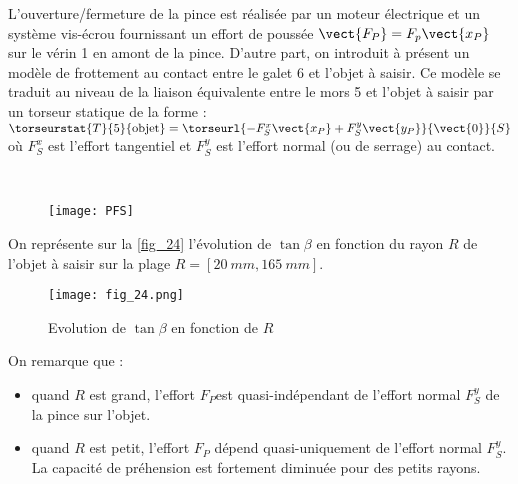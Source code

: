 L'ouverture/fermeture de la pince est réalisée par un moteur électrique et un système vis-écrou
fournissant un effort de poussée $\vect{F_P}=F_p\vect{x_P}$ sur le vérin 1 en amont de la pince. D'autre part, on
introduit à présent un modèle de frottement au contact entre le galet 6 et l'objet à saisir. Ce modèle
se traduit au niveau de la liaison équivalente entre le mors 5 et l'objet à saisir par un torseur
statique de la forme : $\torseurstat{T}{5}{\text{objet}}=\torseurl{-F_S^x\vect{x_P}+F_S^y\vect{y_P}}{\vect{0}}{S}$ 
où $F_S^x$ est l'effort tangentiel et $F_S^y$ est l'effort normal (ou de serrage) au contact.

\ifprof
\begin{corrige}~\\
\begin{figure}[H]
\centering
{\texttt{[image: PFS]}}
\end{figure}

\end{corrige}
\else
\fi

\ifprof
\else
On représente sur la \autoref{fig_24}  l'évolution de $\tan \beta$ en fonction du rayon $R$ de l'objet à saisir sur la plage $R =[\SI{20}{mm}, \SI{165}{mm}]$.

\begin{figure}[H]
\centering
\texttt{[image: fig\_24.png]}
\caption{Evolution de $\tan \beta$ en fonction de $R$ \label{fig_24}}
\end{figure}
\fi


\ifprof
\begin{corrige}
On remarque que :
\begin{itemize}
\item quand $R$ est grand, l’effort $F_P$est quasi-indépendant de l’effort normal $F_S^y$ de la pince sur l’objet. 
\item quand $R$ est petit, l’effort $F_P$ dépend quasi-uniquement de l’effort normal $F_S^y$. La capacité de préhension est fortement diminuée pour des petits rayons.
\end{itemize}
\end{corrige}
\else
\fi

